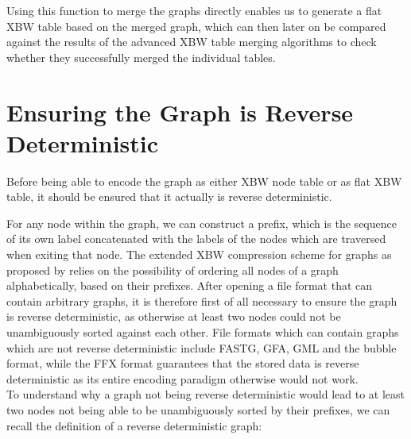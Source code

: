 \documentclass[a4paper,12pt,twoside,BCOR=10mm]{scrbook}
\begin{document}
Using this function to merge the graphs directly 
enables us to generate a flat XBW table based on the merged graph, 
which can then later on be compared against the results of the 
advanced XBW table merging algorithms to check whether they successfully merged the individual tables.

\section{Ensuring the Graph is Reverse Deterministic}
\label{sec:why_rev_det}
%

Before being able to encode the graph as either XBW node table or as flat XBW table, 
it should be ensured that it actually is reverse deterministic.

For any node within the graph, we can construct a prefix, 
which is the sequence of its own label concatenated with the labels of the nodes which are 
traversed when exiting that node. 
The extended XBW compression scheme for graphs as proposed by \citet{Siren2014} relies 
on the possibility of ordering all nodes of a graph alphabetically, based on their prefixes. 
After opening a file format that can contain arbitrary graphs, 
it is therefore first of all necessary to ensure the graph is reverse deterministic, 
as otherwise at least two nodes could not be unambiguously sorted against each other. 
File formats which can contain graphs which are not reverse deterministic include 
FASTG, GFA, GML and the bubble format, while the FFX format guarantees that 
the stored data is reverse deterministic as its entire encoding paradigm 
otherwise would not work. \\
To understand why a graph not being reverse deterministic would lead to 
at least two nodes not being able to be unambiguously sorted by their prefixes, 
we can recall the definition of a reverse deterministic graph:
\end{document}
